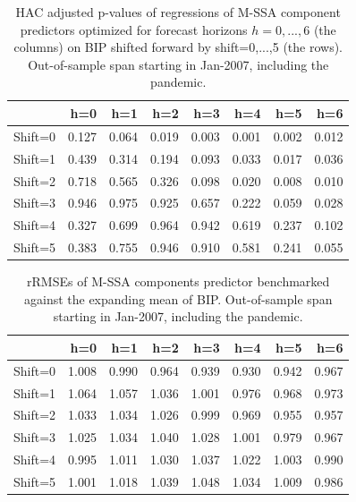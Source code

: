 \documentclass[a4paper]{article}
\begin{document}
\begin{table}[ht]
\centering
\begin{tabular}{rrrrrrrr}
  \hline
 & h=0 & h=1 & h=2 & h=3 & h=4 & h=5 & h=6 \\ 
  \hline
Shift=0 & 0.127 & 0.064 & 0.019 & 0.003 & 0.001 & 0.002 & 0.012 \\ 
  Shift=1 & 0.439 & 0.314 & 0.194 & 0.093 & 0.033 & 0.017 & 0.036 \\ 
  Shift=2 & 0.718 & 0.565 & 0.326 & 0.098 & 0.020 & 0.008 & 0.010 \\ 
  Shift=3 & 0.946 & 0.975 & 0.925 & 0.657 & 0.222 & 0.059 & 0.028 \\ 
  Shift=4 & 0.327 & 0.699 & 0.964 & 0.942 & 0.619 & 0.237 & 0.102 \\ 
  Shift=5 & 0.383 & 0.755 & 0.946 & 0.910 & 0.581 & 0.241 & 0.055 \\ 
   \hline
\end{tabular}
\caption{HAC adjusted p-values of regressions of M-SSA component predictors optimized for forecast horizons $h=0,...,6$  (the columns) on BIP shifted forward by shift=0,...,5 (the rows). Out-of-sample span starting in Jan-2007, including the pandemic.} 
\label{p_val1}
\end{table}%
\begin{table}[ht]
\centering
\begin{tabular}{rrrrrrrr}
  \hline
 & h=0 & h=1 & h=2 & h=3 & h=4 & h=5 & h=6 \\ 
  \hline
Shift=0 & 1.008 & 0.990 & 0.964 & 0.939 & 0.930 & 0.942 & 0.967 \\ 
  Shift=1 & 1.064 & 1.057 & 1.036 & 1.001 & 0.976 & 0.968 & 0.973 \\ 
  Shift=2 & 1.033 & 1.034 & 1.026 & 0.999 & 0.969 & 0.955 & 0.957 \\ 
  Shift=3 & 1.025 & 1.034 & 1.040 & 1.028 & 1.001 & 0.979 & 0.967 \\ 
  Shift=4 & 0.995 & 1.011 & 1.030 & 1.037 & 1.022 & 1.003 & 0.990 \\ 
  Shift=5 & 1.001 & 1.018 & 1.039 & 1.048 & 1.034 & 1.009 & 0.986 \\ 
   \hline
\end{tabular}
\caption{rRMSEs of M-SSA components predictor benchmarked against the expanding mean of BIP. Out-of-sample span starting in Jan-2007, including the pandemic.} 
\label{rRMSE_mSSA_comp_mean2}
\end{table}%
\end{document}
